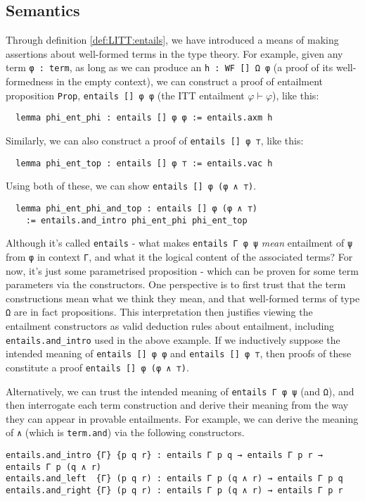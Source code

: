 \documentclass[12pt,leqno]{article}
\def\lc{\lstinline}
\theoremstyle{example}
\numberwithin{equation}{section}
\begin{document}
\subsection{Semantics}

Through definition \ref{def:LITT:entails}, we have introduced a means of making assertions about well-formed terms in the type theory. For example, given any term \lc{φ : term}, as long as we can produce an \lc{h : WF [] Ω φ} (a proof of its well-formedness in the empty context), we can construct a proof of entailment proposition \lc{Prop}, \lc{entails [] φ φ} (the ITT entailment $\varphi \vdash \varphi$), like this:
\begin{lstlisting}
  lemma phi_ent_phi : entails [] φ φ := entails.axm h
\end{lstlisting}
Similarly, we can also construct a proof of \lc{entails [] φ ⊤}, like this:
\begin{lstlisting}
  lemma phi_ent_top : entails [] φ ⊤ := entails.vac h
\end{lstlisting}
Using both of these, we can show \lc{entails [] φ (φ ∧ ⊤)}.
\begin{lstlisting}
  lemma phi_ent_phi_and_top : entails [] φ (φ ∧ ⊤)
    := entails.and_intro phi_ent_phi phi_ent_top
\end{lstlisting}

Although it's called \lc{entails} - what makes \lc{entails Γ φ ψ} \emph{mean} entailment of \lc{ψ} from \lc{φ} in context \lc{Γ}, and what it the logical content of the associated terms? For now, it's just some parametrised proposition - which can be proven for some term parameters via the constructors. One perspective is to first trust that the term constructions mean what we think they mean, and that well-formed terms of type \lc{Ω} are in fact propositions. This interpretation then justifies viewing the entailment constructors as valid deduction rules about entailment, including \lc{entails.and_intro} used in the above example. If we inductively suppose the intended meaning of \lc{entails [] φ φ} and \lc{entails [] φ ⊤}, then proofs of these constitute a proof \lc{entails [] φ (φ ∧ ⊤)}.

Alternatively, we can trust the intended meaning of \lc{entails Γ φ ψ} (and \lc{Ω}), and then interrogate each term construction and derive their meaning from the way they can appear in provable entailments. For example, we can derive the meaning of \lc{∧} (which is \lc{term.and}) via the following constructors.
\begin{lstlisting}[basicstyle=\small\ttfamily]
entails.and_intro {Γ} {p q r} : entails Γ p q → entails Γ p r → entails Γ p (q ∧ r)
entails.and_left  {Γ} (p q r) : entails Γ p (q ∧ r) → entails Γ p q
entails.and_right {Γ} (p q r) : entails Γ p (q ∧ r) → entails Γ p r
\end{lstlisting}
\end{document}
